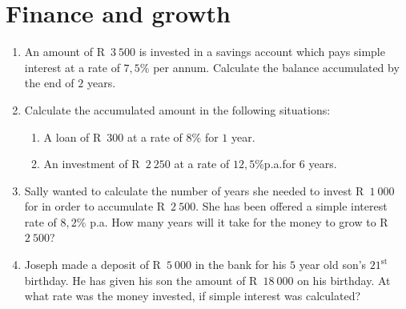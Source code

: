 \chapter{Finance and growth}
\begin{exercises}{}{
    \begin{enumerate}[itemsep=6pt, label=\textbf{\arabic*}.]
	\item An amount of R~$3~500$ is invested in a savings account which pays simple interest at a rate of $7,5\%$ per annum. Calculate the balance accumulated by the end of $2$ years.
	\item Calculate the accumulated amount in the following situations:
	\begin{enumerate}[noitemsep, label=\textbf{(\alph*)} ]
	    \item A loan of R~$300$ at a rate of $8\%$ for $1$ year.
	    \item An investment of R~$2~250$ at a rate of $12,5\%$p.a.\@ for $6$ years.
	\end{enumerate}
	\item Sally wanted to calculate the number of years she needed to invest R~$1~000$ for in order to accumulate R~$2~500$. She has been offered a simple interest rate of $8,2\%$ p.a. How many years will it take for the money to grow to R~$2~500$?
	\item Joseph made a deposit of R~$5~000$ in the bank for his $5$ year old son's $21^{\mathrm{st}}$ birthday. He has given his son the amount of R~$18~000$ on his birthday. At what rate was the money invested, if simple interest was calculated?
    \end{enumerate}
}
\end{exercises}


